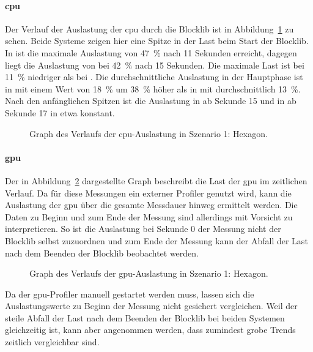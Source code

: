 \paragraph{\ac{cpu}} Der Verlauf der Auslastung der \ac{cpu} durch die Blocklib ist in Abbildung~\ref{fig:seed-0-hexagon-cpu} zu sehen. Beide Systeme zeigen hier eine Spitze in der Last beim Start der Blocklib. In \sysA{} ist die maximale Auslastung von \SI{47}{\percent} nach 11 Sekunden erreicht, dagegen liegt die Auslastung von \sysB{} bei \SI{42}{\percent} nach 15 Sekunden. Die maximale Last ist bei \sysB{} \SI{11}{\percent} niedriger als bei \sysA{}. Die durchschnittliche Auslastung in der Hauptphase ist in \sysB{} mit einem Wert von \SI{18}{\percent} um \SI{38}{\percent} höher als in \sysB{} mit durchschnittlich \SI{13}{\percent}. Nach den anfänglichen Spitzen ist die Auslastung in \sysA{} ab Sekunde 15 und in \sysB{} ab Sekunde 17 in etwa konstant.
\begin{figure}[!htbp]
	\centering
	\caption[Graph des Verlaufs der -Auslastung in Szenario 1: Hexagon.]{Graph des Verlaufs der \ac{cpu}-Auslastung in Szenario 1: Hexagon.}\label{fig:seed-0-hexagon-cpu}
\end{figure}


\paragraph{\ac{gpu}} Der in Abbildung~\ref{fig:seed-0-hexagon-gpu} dargestellte Graph beschreibt die Last der \ac{gpu} im zeitlichen Verlauf. Da für diese Messungen ein externer Profiler genutzt wird, kann die Auslastung der \ac{gpu} über die gesamte Messdauer hinweg ermittelt werden. Die Daten zu Beginn und zum Ende der Messung sind allerdings mit Vorsicht zu interpretieren. So ist die Auslastung bei Sekunde $0$ der Messung nicht der Blocklib selbst zuzuordnen und zum Ende der Messung kann der Abfall der Last nach dem Beenden der Blocklib beobachtet werden. 
\begin{figure}[!htbp]
	\centering
	\caption[Graph des Verlaufs der -Auslastung in Szenario 1: Hexagon.]{Graph des Verlaufs der \ac{gpu}-Auslastung in Szenario 1: Hexagon.}\label{fig:seed-0-hexagon-gpu}
\end{figure}

Da der \ac{gpu}-Profiler manuell gestartet werden muss, lassen sich die Auslastungswerte zu Beginn der Messung nicht gesichert vergleichen. Weil der steile Abfall der Last nach dem Beenden der Blocklib bei beiden Systemen gleichzeitig ist, kann aber angenommen werden, dass zumindest grobe Trends zeitlich vergleichbar sind.

